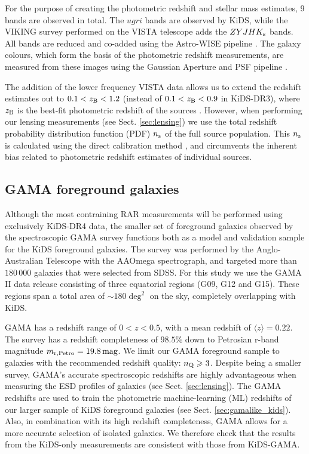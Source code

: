 \documentclass[usenatbib]{mnras}
\newcommand{\magn}{\, {\rm mag} }
\newcommand*{\meanb}[1]{\langle{#1}\rangle}
\newcommand{\un}[1]{_{\rm #1}}
\begin{document}
For the purpose of creating the photometric redshift and stellar mass estimates, 9 bands are observed in total. The $ugri$ bands are observed by KiDS, while the VIKING survey \cite[]{edge2013} performed on the VISTA telescope adds the $ZYJHK\un{s}$ bands. All bands are reduced and co-added using the Astro-WISE pipeline \cite[AW,][]{mcfarland2013}. The galaxy colours, which form the basis of the photometric redshift measurements, are measured from these images using the Gaussian Aperture and PSF pipeline \cite[GAaP,][]{kuijken2008,kuijken2015}.

The addition of the lower frequency VISTA data allows us to extend the redshift estimates out to $0.1<z\un{B}<1.2$ (instead of $0.1<z\un{B}<0.9$ in KiDS-DR3), where $z\un{B}$ is the best-fit photometric redshift of the sources \cite[]{benitez2000,hildebrandt2012}. However, when performing our lensing measurements (see Sect. \ref{sec:lensing}) we use the total redshift probability distribution function (PDF) $n\un{z}$ of the full source population. This $n\un{z}$ is calculated using the direct calibration method \cite[DIR,][]{hildebrandt2017}, and circumvents the inherent bias related to photometric redshift estimates of individual sources.

\subsection{GAMA foreground galaxies}
\label{sec:gama}

Although the most contraining RAR measurements will be performed using exclusively KiDS-DR4 data, the smaller set of foreground galaxies observed by the spectroscopic GAMA survey \cite[]{driver2011} functions both as a model and validation sample for the KiDS foreground galaxies. The survey was performed by the Anglo-Australian Telescope with the AAOmega spectrograph, and targeted more than $180 \, 000$ galaxies that were selected from SDSS. For this study we use the GAMA II data release \cite[]{liske2015} consisting of three equatorial regions (G09, G12 and G15). These regions span a total area of $\sim180 \deg^2$ on the sky, completely overlapping with KiDS.

GAMA has a redshift range of $0<z<0.5$, with a mean redshift of $\meanb{z}=0.22$. The survey has a redshift completeness of $98.5\%$ down to Petrosian r-band magnitude $m\un{r,Petro} = 19.8 \magn$. We limit our GAMA foreground sample to galaxies with the recommended redshift quality: $n\un{Q}\geq3$. Despite being a smaller survey, GAMA's accurate spectroscopic redshifts are highly advantageous when measuring the ESD profiles of galaxies (see Sect. \ref{sec:lensing}). The GAMA redshifts are used to train the photometric machine-learning (ML) redshifts of our larger sample of KiDS foreground galaxies (see Sect. \ref{sec:gamalike_kids}). Also, in combination with its high redshift completeness, GAMA allows for a more accurate selection of isolated galaxies. We therefore check that the results from the KiDS-only measurements are consistent with those from KiDS-GAMA.
\end{document}
